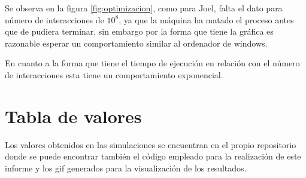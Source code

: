 \documentclass[11pt, twoside]{article} %
\begin{document}
Se observa en la figura \ref{fig:optimizacion}, como para Joel, falta el dato 
para número de interacciones de $10^8$, ya que la máquina ha matado el proceso
antes que de pudiera terminar, sin embargo por la forma que tiene la gráfica es 
razonable esperar un comportamiento similar al ordenador de windows.

En cuanto a la forma que tiene el tiempo de ejecución en relación con el número de interacciones esta tiene un comportamiento exponencial.

\newpage

\appendix

\section{Tabla de valores}

Los valores obtenidos en las simulaciones se encuentran en el propio repositorio
donde se puede encontrar también el código empleado para la realización 
de este informe y los gif generados para la visualización de los resultados.
\end{document}
